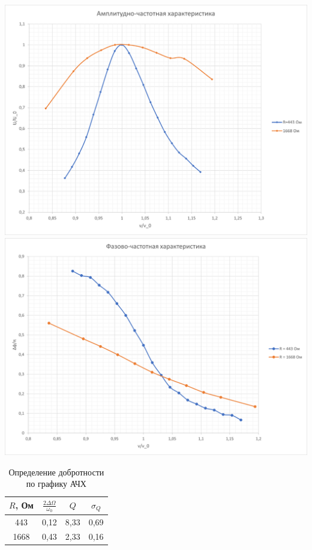 \documentclass[a4paper, 12pt]{article}
\begin{document}
\begin{table}[h]
	\end{table}
	
	\begin{center}
		\includegraphics[width = \textwidth]{Gr3}
		\includegraphics[width = \textwidth]{Gr4}
	\end{center}
	\newpage
	\begin{table}[h!]
		\centering
		\begin{tabular}{|c|c|c|c|}
			\hline
			$R$, Ом & $\frac{2\Delta \Omega}{\omega_0}$ & $Q$ & $\sigma_{Q}$ \\ \hline
			443 & 0,12 & 8,33 & 0,69\\ \hline
			1668 & 0,43 & 2,33 & 0,16 \\ \hline  
		\end{tabular}
		\caption{Определение добротности по графику АЧХ}
	\end{table}
	
\end{document}
